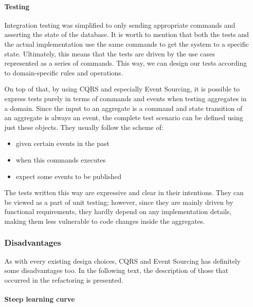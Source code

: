 \documentclass{book}
\begin{document}
\paragraph{Testing}\label{testing}

Integration testing was simplified to only sending appropriate commands
and asserting the state of the database. It is worth to mention that
both the tests and the actual implementation use the same commands to
get the system to a specific state. Ultimately, this means that the
tests are driven by the use cases represented as a series of commands.
This way, we can design our tests according to domain-specific rules and
operations.

On top of that, by using CQRS and especially Event Sourcing, it is
possible to express tests purely in terms of commands and events when
testing aggregates in a domain. Since the input to an aggregate is a
command and state transition of an aggregate is always an event, the
complete test scenario can be defined using just these objects. They
usually follow the scheme of:

\begin{itemize}
\tightlist
\item
  given certain events in the past
\item
  when this commands executes
\item
  expect some events to be published
\end{itemize}

The tests written this way are expressive and clear in their intentions.
They can be viewed as a part of unit testing; however, since they are
mainly driven by functional requirements, they hardly depend on any
implementation details, making them less vulnerable to code changes
inside the aggregates.


\subsubsection{Disadvantages}\label{disadvantages}

As with every existing design choices, CQRS and Event Sourcing has
definitely some disadvantages too. In the following text, the
description of those that occurred in the refactoring is presented.

\paragraph{Steep learning curve}\label{steep-learning-curve}
\end{document}
